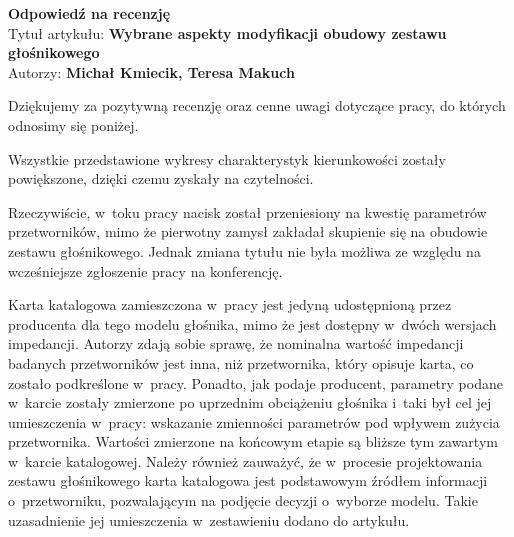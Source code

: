 \documentclass[12pt]{article}
\begin{document}
    
    \begin{center}
        \textbf{Odpowiedź na recenzję }\\
        \vspace{10pt}
        Tytuł artykułu: \textbf{Wybrane aspekty modyfikacji obudowy zestawu głośnikowego} \\
        Autorzy: \textbf{Michał Kmiecik, Teresa Makuch}
    \end{center}

    Dziękujemy za pozytywną recenzję oraz cenne uwagi dotyczące pracy, do których odnosimy się poniżej.
    
    Wszystkie przedstawione wykresy charakterystyk kierunkowości zostały powiększone, dzięki czemu zyskały na czytelności.
    
    Rzeczywiście, w~toku pracy nacisk został przeniesiony na kwestię parametrów przetworników, mimo że pierwotny zamysł zakładał skupienie się na obudowie zestawu głośnikowego. Jednak zmiana tytułu nie była możliwa ze względu na wcześniejsze zgłoszenie pracy na konferencję.
    
    Karta katalogowa zamieszczona w~pracy jest jedyną udostępnioną przez producenta dla tego modelu głośnika, mimo że jest dostępny w~dwóch wersjach impedancji. Autorzy zdają sobie sprawę, że nominalna wartość impedancji badanych przetworników jest inna, niż przetwornika, który opisuje karta, co zostało podkreślone w~pracy. Ponadto, jak podaje producent, parametry podane w~karcie zostały zmierzone po uprzednim obciążeniu głośnika i~taki był cel jej umieszczenia w~pracy: wskazanie zmienności parametrów pod wpływem zużycia przetwornika. Wartości zmierzone na końcowym etapie są bliższe tym zawartym w~karcie katalogowej. Należy również zauważyć, że w~procesie projektowania zestawu głośnikowego karta katalogowa jest podstawowym źródłem informacji o~przetworniku, pozwalającym na podjęcie decyzji o~wyborze modelu. Takie uzasadnienie jej umieszczenia w~zestawieniu dodano do artykułu.
    
\end{document}
